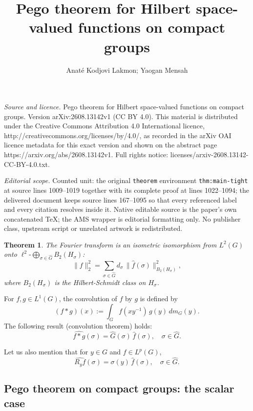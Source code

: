 \documentclass[10pt,a4paper]{amsart}
\newtheorem{theorem}{Theorem}[section]
\def\petitoplus{\mathop{\bigoplus}}
\begin{document}
\title[Pego theorem for Hilbert space-valued functions on compact g]{Pego theorem for Hilbert space-valued functions on compact groups}
\author{Anaté Kodjovi Lakmon; Yaogan Mensah}
\date{}
\maketitle
\noindent\emph{Source and licence.} Pego theorem for Hilbert space-valued functions on compact groups. Version arXiv:2608.13142v1 (CC BY 4.0). This material is distributed under the Creative Commons Attribution 4.0 International licence, http://creativecommons.org/licenses/by/4.0/, as recorded in the arXiv OAI licence metadata for this exact version and shown on the abstract page https://arxiv.org/abs/2608.13142v1. Full rights notice: licenses/arxiv-2608.13142-CC-BY-4.0.txt.\par\smallskip
\noindent\textit{Editorial scope.} Counted unit: the original \texttt{theorem} environment \texttt{thm:main-tight} at source lines 1009--1019 together with its complete proof at lines 1022--1094; the delivered document keeps source lines 167--1095 so that every referenced label and every citation resolves inside it. Native editable source is the paper's own concatenated TeX; the AMS wrapper is editorial formatting only. No publisher class, upstream script or unrelated artwork is redistributed.
\begin{theorem}\label{scalar:plancherel}
The Fourier transform is an isometric isomorphism from $L^2(G)$ onto
$\ell^2\text{-}\petitoplus\limits_{\sigma\in\widehat{G}}B_2(H_\sigma)$:
$$
\|f\|_2^2=\sum_{\sigma\in\widehat{G}}d_\sigma\,\|\hat f(\sigma)\|_{B_2(H_\sigma)}^2,$$
where $B_2(H_\sigma)$ is the Hilbert-Schmidt class on $H_\sigma$.
\end{theorem}



For $f,g\in L^1(G)$, the convolution of $f$ by $g$ is defined by 
$$
(f*g)(x):=\int_G f(xy^{-1})\,g(y)\,dm_G(y).$$
The following result (convolution theorem) holds:
$$\widehat{f*g}(\sigma)=\widehat{G}(\sigma)\,
\widehat f(\sigma),\quad\sigma\in\widehat{G}.
$$

Let us also mention that for $y\in G$ and $f\in L^p(G)$, 
$$
\widehat{R_yf}(\sigma)=\sigma(y)\,\widehat f(\sigma),\quad\sigma\in\widehat{G}.
$$


\subsection{Pego theorem on compact groups: the scalar case}
\end{document}
